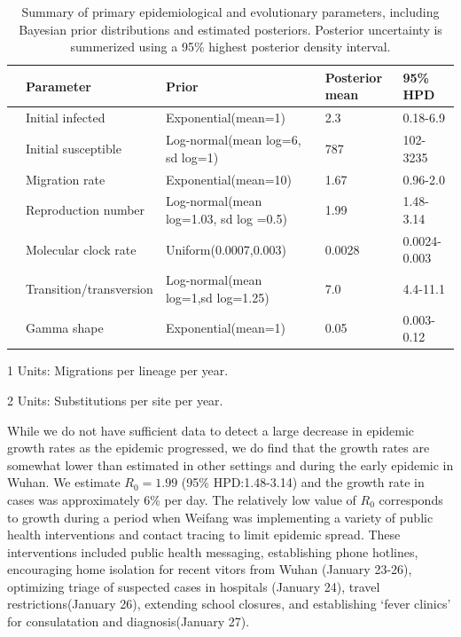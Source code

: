 \documentclass[9pt,lineno,onehalfspacing]{elife}
\begin{document}
\begin{table}[ht]
\begin{fullwidth}
\begin{threeparttable}[b]
\caption{Summary of primary epidemiological and evolutionary parameters, including Bayesian prior distributions and estimated posteriors. Posterior uncertainty is summerized using a 95\% highest posterior density interval. \label{tab:tab1}}
\centering
\begin{tabular}{lllll}
  \hline
 & {\bf Parameter} & {\bf Prior} & {\bf Posterior mean} & \bf{95\% HPD} \\ 
  \hline
  & Initial infected & Exponential(mean=1) & 2.3 & 0.18-6.9 \\ 
  & Initial susceptible & Log-normal(mean log=6, sd log=1) & 787 & 102-3235 \\ 
  & Migration rate\tnote{1} & Exponential(mean=10) & 1.67 & 0.96-2.0 \\ 
  & Reproduction number & Log-normal(mean log=1.03, sd log =0.5) & 1.99 & 1.48-3.14 \\ 
  & Molecular clock rate\tnote{2} & Uniform(0.0007,0.003) & 0.0028 & 0.0024-0.003 \\ 
  & Transition/transversion & Log-normal(mean log=1,sd log=1.25) & 7.0 & 4.4-11.1 \\ 
  & Gamma shape & Exponential(mean=1) & 0.05 & 0.003-0.12 \\ 
   \hline
\end{tabular}
\begin{tablenotes}\item [1] Units: Migrations per lineage per year. \end{tablenotes}
\begin{tablenotes}\item [2] Units: Substitutions per site per year. \end{tablenotes}
\end{threeparttable}
\end{fullwidth}
\end{table}

While we do not have sufficient data to detect a large decrease in epidemic growth rates as the epidemic progressed, we do find that the growth rates are somewhat lower than estimated in other settings and during the early epidemic in Wuhan. 
We estimate $R_0=1.99$ (95\% HPD:1.48-3.14) and the growth rate in cases was approximately 6\% per day. 
The relatively low value of $R_0$ corresponds to growth during a period when Weifang was implementing a variety of public health interventions and contact tracing to limit epidemic spread.
These interventions included public health messaging, establishing phone hotlines, encouraging home isolation for recent vitors from Wuhan (January 23-26), optimizing triage of suspected cases in hospitals (January 24), travel restrictions(January 26), extending school closures, and establishing `fever clinics' for consulatation and diagnosis(January 27)\citep{Mao2020-qu}. 
\end{document}
